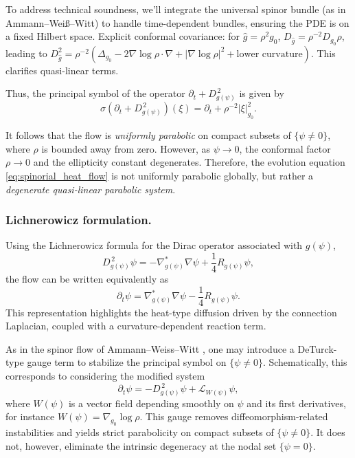 \documentclass[11pt, reqno, a4paper]{amsart}
\theoremstyle{definition}
\theoremstyle{remark}
\begin{document}
To address technical soundness, we'll integrate the universal spinor bundle (as in Ammann--Weiß--Witt) to handle time-dependent bundles, ensuring the PDE is on a fixed Hilbert space. Explicit conformal covariance: for $\hat{g} = \rho^{2} g_{0}$, $D_{\hat{g}} = \rho^{-2} D_{g_{0}} \rho$, leading to $D^{2}_{\hat{g}} = \rho^{-2} \left( \Delta_{g_{0}} - 2 \nabla \log \rho \cdot \nabla + |\nabla \log \rho|^{2} + \textrm{lower curvature} \right)$. This clarifies quasi-linear terms.

Thus, the principal symbol of the operator $\partial_t + D_{g(\psi)}^{\,2}$ is given by
\[
\sigma(\partial_t + D_{g(\psi)}^{\,2})(\xi)
= \partial_t + \rho^{-2} |\xi|_{g_0}^2 .
\]

It follows that the flow is \emph{uniformly parabolic} on compact subsets of
$\{\psi \neq 0\}$, where $\rho$ is bounded away from zero. However, as $\psi \to 0$,
the conformal factor $\rho \to 0$ and the ellipticity constant degenerates.
Therefore, the evolution equation \eqref{eq:spinorial_heat_flow} is not uniformly
parabolic globally, but rather a \emph{degenerate quasi-linear parabolic system}.

\subsubsection{Lichnerowicz formulation.}
Using the Lichnerowicz formula for the Dirac operator associated with $g(\psi)$,
\begin{equation}
D_{g(\psi)}^{\,2} \psi
= - \nabla^{*}_{g(\psi)} \nabla \psi
+ \frac{1}{4} R_{g(\psi)} \psi ,
\label{eq:lichnerowicz}
\end{equation}
the flow can be written equivalently as
\begin{equation}
\partial_t \psi
= \nabla^{*}_{g(\psi)} \nabla \psi
- \frac{1}{4} R_{g(\psi)} \psi .
\label{eq:heat_reaction_form}
\end{equation}
This representation highlights the heat-type diffusion driven by the connection
Laplacian, coupled with a curvature-dependent reaction term.

As in the spinor flow of Ammann--Weiss--Witt \cite{ammann2012},
one may introduce a DeTurck-type gauge term to stabilize the principal symbol on
$\{\psi \neq 0\}$. Schematically, this corresponds to considering the modified system
\begin{equation}
\partial_t \psi
= - D_{g(\psi)}^{\,2} \psi + \mathcal{L}_{W(\psi)} \psi ,
\label{eq:deturck_spinor}
\end{equation}
where $W(\psi)$ is a vector field depending smoothly on $\psi$ and its first derivatives,
for instance $W(\psi) = \nabla_{g_0} \log \rho$.
This gauge removes diffeomorphism-related instabilities and yields strict parabolicity
on compact subsets of $\{\psi \neq 0\}$.
It does not, however, eliminate the intrinsic degeneracy at the nodal set $\{\psi=0\}$.
\end{document}
